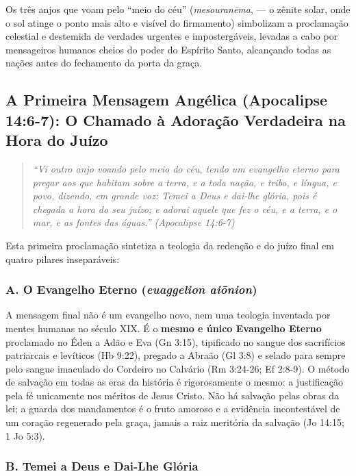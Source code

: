 Os três anjos que voam pelo ``meio do céu'' (\textit{mesouranēma}, — o zênite solar, onde o sol atinge o ponto mais alto e visível do firmamento) simbolizam a proclamação celestial e destemida de verdades urgentes e impostergáveis, levadas a cabo por mensageiros humanos cheios do poder do Espírito Santo, alcançando todas as nações antes do fechamento da porta da graça.



\subsection{A Primeira Mensagem Angélica (Apocalipse 14:6-7): O Chamado à Adoração Verdadeira na Hora do Juízo}



\begin{quote}
\itshape \textit{``Vi outro anjo voando pelo meio do céu, tendo um evangelho eterno para pregar aos que habitam sobre a terra, e a toda nação, e tribo, e língua, e povo, dizendo, em grande voz: Temei a Deus e dai-lhe glória, pois é chegada a hora do seu juízo; e adorai aquele que fez o céu, e a terra, e o mar, e as fontes das águas.''} (Apocalipse 14:6-7)
\end{quote}


Esta primeira proclamação sintetiza a teologia da redenção e do juízo final em quatro pilares inseparáveis:


\subsubsection*{A. O Evangelho Eterno (\textit{euaggelion aiōnion})}

A mensagem final não é um evangelho novo, nem uma teologia inventada por mentes humanas no século XIX. É o \textbf{mesmo e único Evangelho Eterno} proclamado no Éden a Adão e Eva (Gn 3:15), tipificado no sangue dos sacrifícios patriarcais e levíticos (Hb 9:22), pregado a Abraão (Gl 3:8) e selado para sempre pelo sangue imaculado do Cordeiro no Calvário (Rm 3:24-26; Ef 2:8-9). O método de salvação em todas as eras da história é rigorosamente o mesmo: a justificação pela fé unicamente nos méritos de Jesus Cristo. Não há salvação pelas obras da lei; a guarda dos mandamentos é o fruto amoroso e a evidência incontestável de um coração regenerado pela graça, jamais a raiz meritória da salvação (Jo 14:15; 1 Jo 5:3).


\subsubsection*{B. Temei a Deus e Dai-Lhe Glória}

